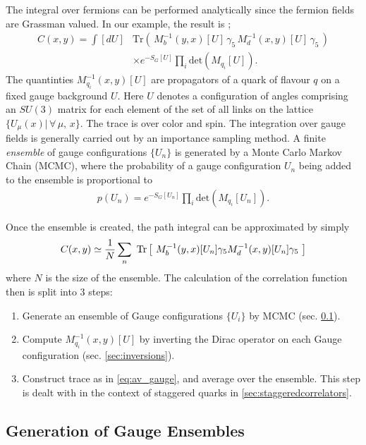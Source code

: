 The integral over fermions can be performed analytically since the fermion fields are Grassman valued. In our example, the result is \cite{Peskin:1995ev};
\begin{align}
  \nonumber
  C(x,y) = \int [dU] &\text{Tr}\left( \, M^{-1}_b(y,x)[U] \, \gamma_5 \, M^{-1}_d(x,y)[U] \, \gamma_5 \, \right) \\ &\times e^{-S_G[U]} \prod_i\text{det}(M_{q_i}[U]).
  \label{eq:lattice_correlator}
\end{align}
The quantinties $M_{q_i}^{-1}(x,y)[U]$ are propagators of a quark of flavour $q$ on a fixed gauge background $U$. Here $U$ denotes a configuration of angles comprising an $SU(3)$ matrix for each element of the set of all links on the lattice $\{ U_{\mu}(x) | \,\forall \,\mu,\,x \}$. The trace is over color and spin. The integration over gauge fields is generally carried out by an importance sampling method. A finite \textit{ensemble} of gauge configurations $\{U_n\}$ is generated by a Monte Carlo Markov Chain (MCMC), where the probability of a gauge configuration $U_n$ being added to the ensemble is proportional to
\begin{align}
  p(U_n) = e^{-S_G[U_n]}\prod_i\text{det}(M_{q_i}[U_n]).
  \label{eq:MCweight}
\end{align}

Once the ensemble is created, the path integral can be approximated by simply
\begin{align}
  C(x,y) \simeq {1\over N} \sum_n \text{ Tr}\left[\text{ } M^{-1}_b(y,x)[U_n] \gamma_5 M^{-1}_d(x,y)[U_n] \gamma_5 \text{ }\right]
  \label{eq:av_gauge}
\end{align}
where $N$ is the size of the ensemble. The calculation of the correlation function then is split into 3 steps:
\begin{enumerate}
\item
  Generate an ensemble of Gauge configurations $\{ U_i \}$ by MCMC (sec. \ref{sec:MCMC}).
\item
  Compute $M^{-1}_{q_i}(x,y)[U]$ by inverting the Dirac operator on each Gauge configuration (sec. \ref{sec:inversions}).
\item
  Construct trace as in \eqref{eq:av_gauge}, and average over the ensemble. This step is dealt with in the context of staggered quarks in \ref{sec:staggeredcorrelators}.
\end{enumerate}


\subsection{Generation of Gauge Ensembles}
\label{sec:MCMC}

